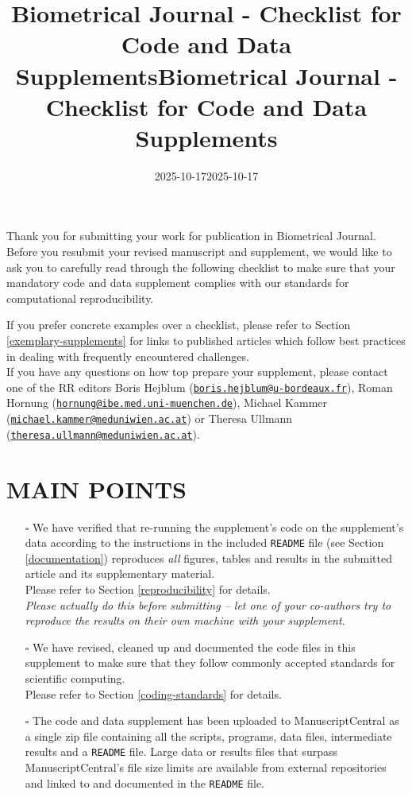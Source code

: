 \documentclass[
  paper=a4,
  ,captions=tableheading
]{scrartcl}
\title{Biometrical Journal - Checklist for Code and Data Supplements}
\author{}
\date{2025-10-17}
\title{Biometrical Journal - Checklist for Code and Data Supplements}
\author{}
\date{2025-10-17}
\let\oldtexttt\texttt
\renewcommand{\texttt}[1]{\colorbox{bgcolor}{\small \oldtexttt{#1}}}
\begin{document}




Thank you for submitting your work for publication in Biometrical Journal. Before you resubmit your revised manuscript and supplement, we would like to ask you to carefully read through the following checklist to make sure that your mandatory code and data supplement complies with our standards for computational reproducibility.

If you prefer concrete examples over a checklist, please refer to Section \ref{exemplary-supplements} for links to published articles which follow best practices in dealing with frequently encountered challenges.\\
If you have any questions on how top prepare your supplement, please contact one of the RR editors Boris Hejblum (\href{mailto:boris.hejblum@u-bordeaux.fr}{\nolinkurl{boris.hejblum@u-bordeaux.fr}}), Roman Hornung (\href{mailto:hornung@ibe.med.uni-muenchen.de}{\nolinkurl{hornung@ibe.med.uni-muenchen.de}}), Michael Kammer (\href{mailto:michael.kammer@meduniwien.ac.at}{\nolinkurl{michael.kammer@meduniwien.ac.at}}) or Theresa Ullmann (\href{mailto:theresa.ullmann@meduniwien.ac.at}{\nolinkurl{theresa.ullmann@meduniwien.ac.at}}).

\section{MAIN POINTS}\label{main-points}

\begin{itemize}
\item[$\square$]
  We have verified that re-running the supplement's code on the supplement's data according to the instructions in the included \texttt{README} file (see Section \ref{documentation}) reproduces \emph{all} figures, tables and results in the submitted article and its supplementary material.\\
  Please refer to Section \ref{reproducibility} for details.\\
  \emph{Please actually do this before submitting -- let one of your co-authors try to reproduce the results on their own machine with your supplement.}
\item[$\square$]
  We have revised, cleaned up and documented the code files in this supplement to make sure that they follow commonly accepted standards for scientific computing.\\
  Please refer to Section \ref{coding-standards} for details.
\item[$\square$]
  The code and data supplement has been uploaded to ManuscriptCentral as a single zip file containing all the scripts, programs, data files, intermediate results and a \texttt{README} file. Large data or results files that surpass ManuscriptCentral's file size limits are available from external repositories and linked to and documented in the \texttt{README} file.
\end{itemize}
\end{document}
